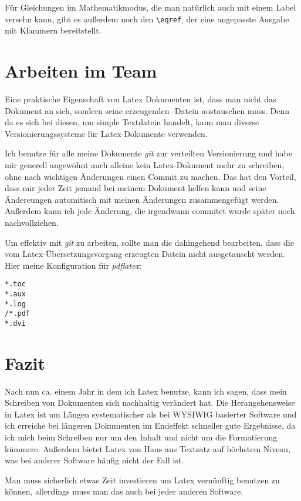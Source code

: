 Für Gleichungen im Mathematikmodus, die man natürlich auch mit einem Label versehn kann, gibt es außerdem noch
den \verb+\eqref+, der eine angepasste Ausgabe mit Klammern bereitstellt. 

\section{Arbeiten im Team}
Eine praktische Eigenschaft von Latex Dokumenten ist, dass man nicht das Dokument an sich, sondern seine erzeugenden
-Datein austauschen muss. Denn da es sich bei diesen, um simple Textdatein handelt, kann man diverse
Versionierungssysteme für Latex-Dokumente verwenden. 

Ich benutze für alle meine Dokumente \textit{git} zur verteilten Versionierung und habe mir generell angewöhnt
auch alleine kein Latex-Dokument mehr zu schreiben, ohne nach wichtigen Änderungen einen Commit zu machen. Das hat
den Vorteil, dass mir jeder Zeit jemand bei meinem Dokument helfen kann und seine Ändereungen automitisch mit
meinen Änderungen zusammengefügt werden. Außerdem kann ich jede Änderung, die irgendwann commitet wurde später noch
nachvollziehen.

Um effektiv mit \textit{git} zu arbeiten, sollte man die  dahingehend bearbeiten, dass die vom
Latex-Übersetzungsvorgang erzeugten Datein nicht ausgetauscht werden. Hier meine Konfiguration für
\textit{pdflatex}:
\begin{verbatim}
*.toc
*.aux
*.log
/*.pdf
*.dvi
\end{verbatim}

\section{Fazit}
Nach nun ca. einem Jahr in dem ich Latex benutze, kann ich sagen, dass mein Schreiben von Dokumenten sich nachhaltig
verändert hat. Die Herangehensweise in Latex ist um Längen systematischer als bei WYSIWIG basierter Software und ich
erreiche bei längeren Dokumenten im Endeffekt schneller gute Ergebnisse, da ich mich beim Schreiben nur um den Inhalt
und nicht um die Formatierung kümmere. Außerdem bietet Latex von Haus aus Textsatz auf höchstem Niveau, was bei
anderer Software häufig nicht der Fall ist.

Man muss sicherlich etwas Zeit investieren um Latex vernünftig benutzen zu können, allerdings muss man das auch
bei jeder anderen Software.

